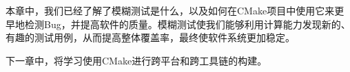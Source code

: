 
本章中，我们已经了解了模糊测试是什么，以及如何在CMake项目中使用它来更早地检测Bug，并提高软件的质量。模糊测试使我们能够利用计算能力发现新的、有趣的测试用例，从而提高整体覆盖率，最终使软件系统更加稳定。

下一章中，将学习使用CMake进行跨平台和跨工具链的构建。